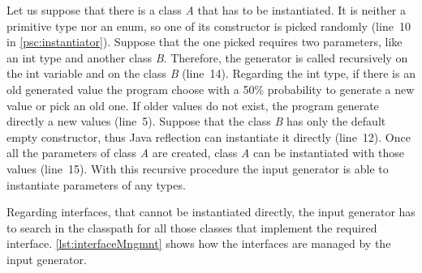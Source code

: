 Let us suppose that there is a class \textit{A} that has to be instantiated. It is neither a  primitive type nor an enum, so one of its constructor is picked randomly (line~10 in \autoref{psc:instantiator}). Suppose that the one picked requires two parameters, like an int type and another class \textit{B}. Therefore, the generator is called recursively on the int variable and on the class \textit{B} (line~14).
Regarding the int type, if there is an old generated value the program choose with a 50\% probability to generate a new value or pick an old one. If older values do not exist, the program generate directly a new values (line~5).
Suppose that the class \textit{B} has only the default empty constructor, thus Java reflection can instantiate it directly (line~12). Once all the parameters of class \textit{A} are created, class \textit{A} can be instantiated with those values (line~15). With this recursive procedure the input generator is able to instantiate parameters of any types.



Regarding interfaces, that cannot be instantiated directly, the input generator has to search in the classpath for all those classes that implement the required interface. \autoref{lst:interfaceMngmnt} shows how the interfaces are managed by the input generator.

